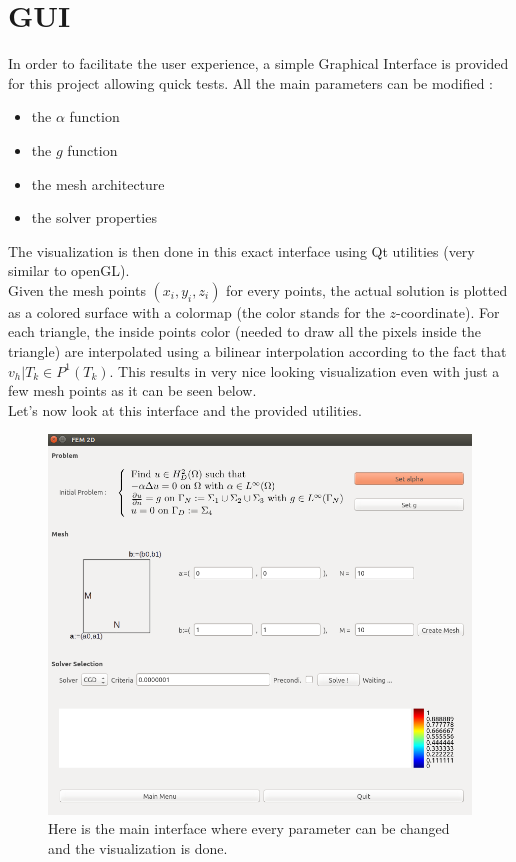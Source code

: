 \documentclass[a4paper]{report}
\begin{document}
\section{GUI}
In order to facilitate the user experience, a simple Graphical Interface is provided for this project allowing quick tests. All the main parameters can be modified :
\begin{itemize}
\item the $\alpha$ function
\item the $g$ function
\item the mesh architecture
\item the solver properties
\end{itemize}
The visualization is then done in this exact interface using Qt utilities (very similar to openGL). \\
Given the mesh points $(x_i,y_i,z_i)$ for every points, the actual solution is plotted as a colored surface with a colormap (the color stands for the $z$-coordinate). For each triangle, the inside points color (needed to draw all the pixels inside the triangle) are interpolated using a bilinear interpolation according to the fact that $v_h|{T_k} \in P^1(T_k)$. This results in very nice looking visualization even with just a few mesh points as it can be seen below. \\
Let's now look at this interface and the provided utilities.
\begin{figure}[H]
\begin{center}
\includegraphics[scale=0.40]{fem_nude.png}\caption{Here is the main interface where every parameter can be changed and the visualization is done.}
\end{center}
\end{figure}
\end{document}

